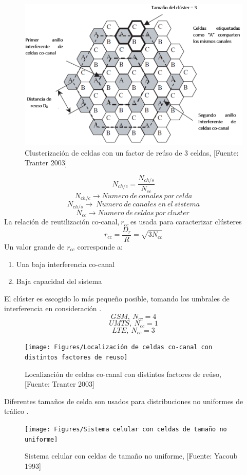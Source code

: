 \begin{figure}[th]
    \centering
    \includegraphics[scale=.5]{Figures/Clusterización de celdas con un factor de reúso de 3 celdas}
    \decoRule
    \caption[Clusterización de celdas con un factor de reúso de 3 celdas]{Clusterización de celdas con un factor de reúso de 3 celdas, [Fuente: Tranter 2003]}
    \label{fig:clusterizacion}
\end{figure}

\begin{equation}
N_{ch/c}=\frac{N_{ch/s}}{N_{cc}} 
\label{eqn:Nch}
\end{equation}
\[N_{ch/c}\to Numero\ de\ canales\ por\ celda\] 
\[N_{ch/s}\to \ Numero\ de\ canales\ en\ el\ sistema\] 
\[N_{cc}\to Numero\ de\ celdas\ por\ cluster\ \] 
La relación de reutilización co-canal,$\ r_{cc}\ $es usada para caracterizar clústeres\
\begin{equation}
r_{cc}=\frac{D_r}{R}=\sqrt{3N_{cc}}
\label{eqn:}
\end{equation}
Un valor grande de $r_{cc}$ corresponde a:
\begin{enumerate}
\item  Una baja interferencia co-canal
\item  Baja capacidad del sistema
\end{enumerate}
El clúster es escogido lo más pequeño posible, tomando los umbrales de interferencia en consideración \parencite{Correia2018}.
\[GSM,\ {N}_{cc}=4\] 
\[UMTS,\ {N}_{cc}=1\] 
\[LTE,\ {N}_{cc}=3\] 
\begin{figure}[th]
\centering
\texttt{[image: Figures/Localización de celdas co-canal con distintos factores de reuso]}
\decoRule
\caption[Localización de celdas co-canal con distintos factores de reúso]{Localización de celdas co-canal con distintos factores de reúso, [Fuente: Tranter 2003]}
\label{fig:celdascocanal}
\end{figure}
Diferentes tamaños de celda son usados para distribuciones no uniformes de tráfico \parencite{TurjmanSmallCells}.\newline
\begin{figure}[th]
\centering
\texttt{[image: Figures/Sistema celular con celdas de tamaño no uniforme]}
\decoRule
\caption[Sistema celular con celdas de tamaño no uniforme]{Sistema celular con celdas de tamaño no uniforme, [Fuente: Yacoub 1993]}
\label{fig:nouniformcells}
\end{figure}

